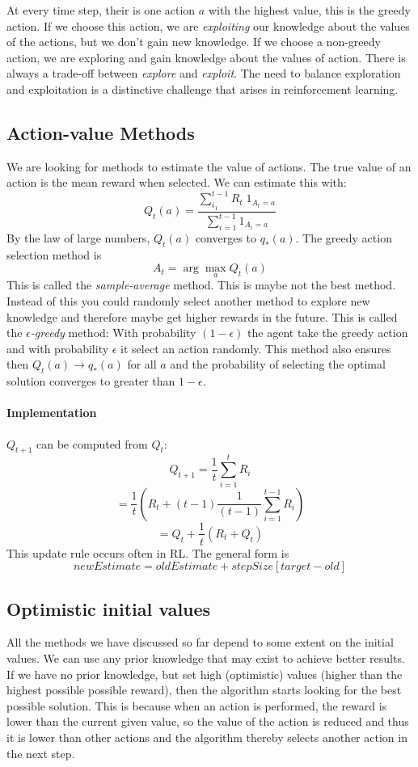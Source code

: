 \documentclass[10pt,a4paper]{article}
\begin{document}
At every time step, their is one action $a$ with the highest value, this is the greedy action. If we choose this action, we are \textit{exploiting} our knowledge about the values of the actions, but we don't gain new knowledge. If we choose a non-greedy action, we are exploring and gain knowledge about the values of action. 
There is always a trade-off between \textit{explore} and \textit{exploit}. The need to balance exploration
and exploitation is a distinctive challenge that arises in reinforcement learning.

\subsection{Action-value Methods}
We are looking for methods to estimate the value of actions. The true value of an action is the mean reward when selected. We can estimate this with:
\[ Q_t(a) = \frac{\sum_{i_1}^{t-1}R_t \; 1_{A_t=a}}{\sum_{i=1}^{t-1} 1_{A_i=a} } \]
By the law of large numbers, $Q_t(a)$ converges to $q_*(a)$.
The greedy action selection method is
\[ A_t = \arg\max_a Q_t(a) \]
This is called the \textit{sample-average} method. This is maybe not the best method. Instead of this you could randomly select another method to explore new knowledge and therefore maybe get higher rewards in the future.
This is called the $\epsilon$\textit{-greedy} method: With probability $(1-\epsilon)$ the agent take the greedy action and with probability $\epsilon$ it select an action randomly.
This method also ensures then $Q_t(a) \rightarrow q_*(a)$ for all $a$ and the probability of selecting the optimal solution converges to greater than $1-\epsilon$.

\paragraph{Implementation}
$Q_{t+1}$ can be computed from $Q_t$:
\[ Q_{t+1} = \frac{1}{t}\sum_{i=1}^t R_i \]
\[ = \frac{1}{t}(R_t + (t-1)\frac{1}{(t-1)}\sum_{i=1}^{t-1} R_i)\]
\[ = Q_t + \frac{1}{t}(R_t + Q_t) \]
This update rule occurs often in RL. The general form is
\[ newEstimate = oldEstimate + stepSize[target - old]\]

\subsection{Optimistic initial values}
All the methods we have discussed so far depend to some extent on the initial values.
We can use any prior knowledge that may exist to achieve better results. If we have no
prior knowledge, but set high (optimistic) values (higher than the highest possible
possible reward), then the algorithm starts looking for the best possible solution. This is because when an action is performed, the reward is lower than the current given value, so the value of the action is reduced and thus it is lower than other actions and the algorithm thereby selects another action in the next step.
\end{document}
